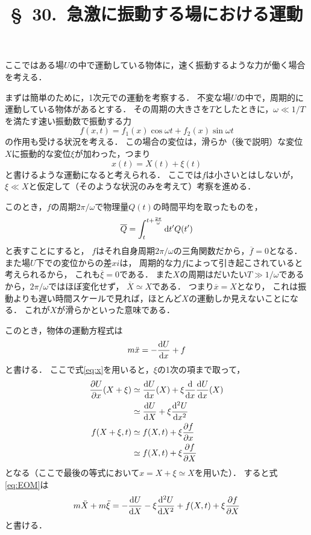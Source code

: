 \documentclass[a4paper]{jsarticle}
\title{\S\ 30.\ 急激に振動する場における運動}
\newcommand{\dif}[2]{\frac{{\rm d} #1}{{\rm d} #2}}
\newcommand{\pdif}[2]{\frac{\partial #1}{\partial #2}}
\begin{document}
\maketitle

ここではある場$U$の中で運動している物体に，速く振動するような力が働く場合を考える．

まずは簡単のために，1次元での運動を考察する．
不変な場$U$の中で，周期的に運動している物体があるとする．
その周期の大きさを$T$としたときに，$\omega \ll 1/T$を満たす速い振動数で振動する力
\begin{equation}
	f(x, t) = f_1(x) \cos \omega t + f_2(x) \sin \omega t
\end{equation}
の作用も受ける状況を考える．
この場合の変位は，滑らか（後で説明）な変位$X$に振動的な変位$\xi$が加わった，つまり
\begin{equation}
	x(t) = X(t) + \xi(t) \label{eq:x}
\end{equation}
と書けるような運動になると考えられる．
ここでは$f$は小さいとはしないが，
$\xi \ll X$と仮定して（そのような状況のみを考えて）考察を進める．

このとき，$f$の周期$2\pi/\omega$で物理量$Q(t)$の時間平均を取ったものを，
\begin{equation}
	\overline{Q} = \int_t^{t + \frac{2\pi}{\omega}} {\rm d}t^{\prime} Q(t^{\prime})
\end{equation}
と表すことにすると，
$f$はそれ自身周期$2\pi/\omega$の三角関数だから，$\overline{f} = 0$となる．
また場$U$下での変位からの差$xi$は，
周期的な力$f$によって引き起こされていると考えられるから，
これも$\overline{\xi}=0$である．
また$X$の周期はだいたい$T \gg 1/\omega$であるから，$2\pi/\omega$ではほぼ変化せず，
$\overline{X} \simeq X$である．
つまり$\overline{x} = X$となり，
これは振動よりも遅い時間スケールで見れば，ほとんど$X$の運動しか見えないことになる．
これが$X$が滑らかといった意味である．

このとき，物体の運動方程式は
\begin{equation}
	m\ddot{x} = -\dif{U}{x} + f \label{eq:EOM}
\end{equation}
と書ける．
ここで式\eqref{eq:x}を用いると，$\xi$の1次の項まで取って，
\begin{align}
	\pdif{U}{x}(X+\xi) &\simeq \dif{U}{x}(X) + \xi \dif{}{x}\dif{U}{x}(X) \\
	&\simeq \dif{U}{X} + \xi \frac{{\rm d}^2 U}{{\rm d}x^2} \qquad \\
	f(X + \xi, t) &\simeq f(X, t) + \xi\pdif{f}{x} \\
	&\simeq f(X, t) + \xi\pdif{f}{X}
\end{align}
となる（ここで最後の等式において$x = X + \xi \simeq X$を用いた）．
すると式\eqref{eq:EOM}は
\begin{equation}
	m\ddot{X} + m\ddot{\xi} =
	-\dif{U}{X} - \xi \frac{{\rm d}^2 U}{{\rm d}X^2}
	+ f(X, t) + \xi \pdif{f}{X}
	\label{eq:EOM2}
\end{equation}
と書ける．
\end{document}
